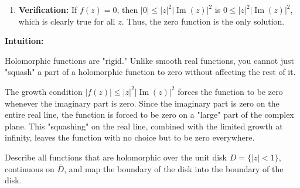 \begin{solution}
\begin{enumerate}
    \item \textbf{Verification:} If $f(z) = 0$, then $|0| \leq |z|^2 |\operatorname{Im}(z)|^2$ is $0 \leq |z|^2 |\operatorname{Im}(z)|^2$, which is clearly true for all $z$. Thus, the zero function is the only solution.
\end{enumerate}
\par\medskip
\textbf{Intuition:}
\par\medskip
Holomorphic functions are "rigid." Unlike smooth real functions, you cannot just "squash" a part of a holomorphic function to zero without affecting the rest of it. 
\par\medskip
The growth condition $|f(z)| \leq |z|^2 |\operatorname{Im}(z)|^2$ forces the function to be zero whenever the imaginary part is zero. Since the imaginary part is zero on the entire real line, the function is forced to be zero on a "large" part of the complex plane. This "squashing" on the real line, combined with the limited growth at infinity, leaves the function with no choice but to be zero everywhere.
\end{solution}


\begin{exercise}
\label{analysis:2015:4}
Describe all functions that are holomorphic over the unit disk $D=\{|z|<1\}$, continuous on $\bar{D}$, and map the boundary of the disk into the boundary of the disk.
\end{exercise}

